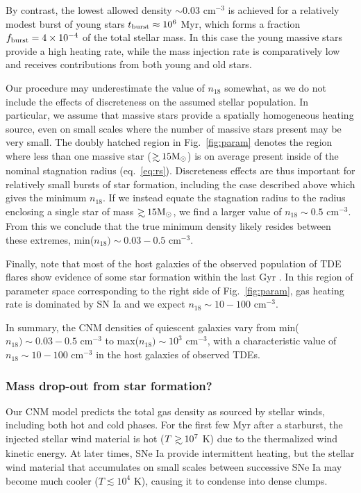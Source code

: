 \documentclass[usenatbib,fleqn]{mnras}
\newcommand\gsim{\mathrel{\rlap{\lower4pt\hbox{\hskip1pt$\sim$}}
    \raise1pt\hbox{$>$}}}
\newcommand{\Msun}{{\rm M_\odot}}
\begin{document}
By contrast, the lowest allowed density $\sim 0.03$ cm$^{-3}$ is
achieved for a relatively modest burst of young stars $t_{\rm burst}
\approx 10^{6}$ Myr, which forms a fraction $f_{\rm burst} = 4\times
10^{-4}$ of the total stellar mass. In this case the young massive
stars provide a high heating rate, while the mass injection rate is
comparatively low and receives contributions from both young and old
stars.

Our procedure may underestimate the value of $n_{18}$ somewhat, as we
do not include the effects of discreteness on the assumed stellar
population.  In particular, we assume that massive stars provide a
spatially homogeneous heating source, even on small scales where the
number of massive stars present may be very small.  The doubly hatched
region in Fig.~\ref{fig:param} denotes the region where less than one
massive star ($\gsim 15 \Msun$) is on average present inside of the
nominal stagnation radius (eq.~\ref{eq:rs}).  Discreteness effects are
thus important for relatively small bursts of star formation,
including the case described above which gives the minimum $n_{18}$.
If we instead equate the stagnation radius to the radius enclosing a
single star of mass $\gsim 15 \Msun$, we find a larger value of
$n_{18}\sim 0.5$ cm$^{-3}$.  From this we conclude that the true
minimum density likely resides between these extremes, min($n_{18})
\sim 0.03-0.5$ cm$^{-3}$.

Finally, note that most of the host galaxies of the observed population of TDE flares show evidence of some
star formation within the last Gyr \citep{French+2016}.  In this
region of parameter space corresponding to the right side of
Fig.~\ref{fig:param}, gas heating rate is dominated by SN Ia and we
expect $n_{18}\sim 10-100$ cm$^{-3}$.

In summary, the CNM densities of quiescent galaxies vary from min($n_{18}) \sim 0.03-0.5$ cm$^{-3}$ to max($n_{18})\sim
10^{3}$ cm$^{-3}$, with a characteristic value of $n_{18}\sim 10-100$ cm$^{-3}$
in the host galaxies of observed TDEs.

\subsubsection{Mass drop-out from star formation?}

Our CNM model predicts the total gas density as sourced by
stellar winds, including both hot and cold phases.  For the first few
Myr after a starburst, the injected stellar wind material is hot
($T\gsim 10^{7}$ K) due to the thermalized wind kinetic energy.
At later times, SNe Ia provide intermittent heating, but the stellar wind
material that accumulates on small scales between successive SNe Ia
may become much cooler ($T \lesssim 10^{4}$ K), causing it to condense into dense clumps.
\end{document}
